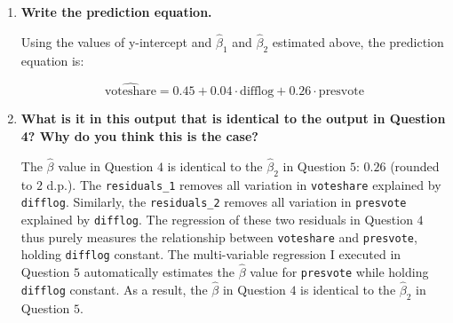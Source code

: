 \documentclass[12pt,letterpaper]{article}
\begin{document}
\begin{enumerate}
\begin{verbatim}
			Residual standard error: 0.07339 on 3190 degrees of freedom
			Multiple R-squared:  0.4496,	Adjusted R-squared:  0.4493 
			F-statistic:  1303 on 2 and 3190 DF,  p-value: < 2.2e-16
		\end{verbatim}
		
		\item \textbf{Write the prediction equation.}	\vspace{0cm}
		
		Using the values of y-intercept and $\hat{\beta}_1$ and $\hat{\beta}_2$ estimated above, the prediction equation is:
		
		$$\widehat{\text{voteshare}} = 0.45 + 0.04 \cdot \text{difflog} + 0.26 \cdot \text{presvote}$$ 
		
		\item \textbf{What is it in this output that is identical to the output in Question 4? Why do you think this is the case?}
		
		The $\hat{\beta}$ value in Question $4$ is identical to the $\hat{\beta}_2$ in Question $5$: $0.26$ (rounded to $2$ d.p.). The \texttt{residuals\_1} removes all variation in \texttt{voteshare} explained by \texttt{difflog}. Similarly, the \texttt{residuals\_2} removes all variation in \texttt{presvote} explained by \texttt{difflog}. The regression of these two residuals in Question $4$ thus purely measures the relationship between \texttt{voteshare} and \texttt{presvote}, holding \texttt{difflog} constant. The multi-variable regression I executed in Question $5$ automatically estimates the $\hat{\beta}$ value for \texttt{presvote} while holding \texttt{difflog} constant. As a result, the $\hat{\beta}$ in Question $4$ is identical to the $\hat{\beta}_2$ in Question $5$.
		
	\end{enumerate}
\end{document}
